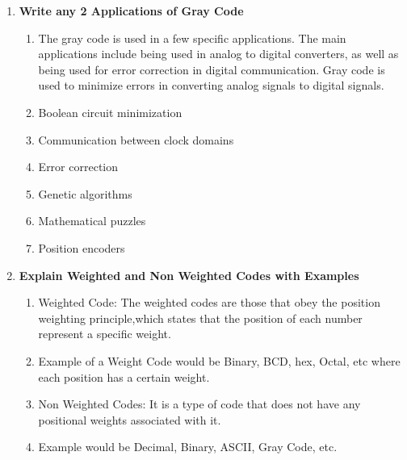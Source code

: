 \documentclass[11pt]{article}
\begin{document}
\begin{enumerate}
	\item \textbf{Write any 2 Applications of Gray Code}
	\begin{enumerate}
		\item The gray code is used in a few specific applications. The main applications include being used in analog to digital converters, as well as being used for error correction in digital communication. Gray code is used to minimize errors in converting analog signals to digital signals.
		\item Boolean circuit minimization
		\item Communication between clock domains
		\item Error correction
		\item Genetic algorithms
		\item Mathematical puzzles
		\item Position encoders
	\end{enumerate}
	\item \textbf{Explain Weighted and Non Weighted Codes with Examples}
	\begin{enumerate}
		\item Weighted Code: The weighted codes are those that obey the position weighting principle,which states that the position of each number represent a specific weight. 
		\item Example of a Weight Code would be Binary, BCD, hex, Octal, etc where each position has a certain weight.
		\item Non Weighted Codes: It is a type of code that does not have any positional weights associated with it. 
		\item Example would be Decimal, Binary, ASCII, Gray Code, etc. 
	\end{enumerate}
\end{enumerate}
\end{document}
